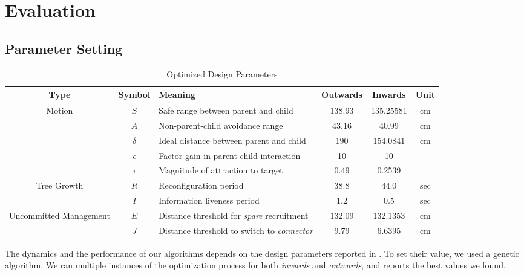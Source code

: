 \section{Evaluation}
\label{sec:evaluation}

\subsection{Parameter Setting}
\label{sec:paramopt}

\begin{table*}[t]
  \centering
  \caption{Optimized Design Parameters}
  \label{tab:paramopt}
  \begin{tabular}{|c|c|l|c|c|c|}
    \hline
    Type & Symbol & Meaning & Outwards & Inwards & Unit\\
    \hline
    \hline
    \multirow{5}{*}{Motion}
    & $S$ & Safe range between parent and child & 138.93 & 135.25581 & cm \\
    \cline{2-6}
    & $A$ & Non-parent-child avoidance range & 43.16 & 40.99 & cm\\
    \cline{2-6}
    & $\delta$ & Ideal distance between parent and child & 190 & 154.0841 & cm\\
    \cline{2-6}
    & $\epsilon$ & Factor gain in parent-child interaction & 10 & 10 & \\
    \cline{2-6}
    & $\tau$ & Magnitude of attraction to target & 0.49 & 0.2539 & \\
    \hline
    \multirow{2}{*}{Tree Growth}
    & $R$ & Reconfiguration period & 38.8 & 44.0 & sec\\
    \cline{2-6}
    & $I$ & Information liveness period & 1.2 & 0.5 & sec\\
    \cline{2-6}
    \hline
    \multirow{2}{*}{Uncommitted Management}
    & $E$ & Distance threshold for \emph{spare} recruitment & 132.09 & 132.1353 & cm\\
    \cline{2-6}
    & $J$ & Distance threshold to switch to \emph{connector} & 9.79 & 6.6395 & cm\\
    \cline{2-6}
    \hline
  \end{tabular}
\end{table*}

The dynamics and the performance of our algorithms depends on the
design parameters reported in . To set their value, we
used a genetic algorithm. We ran multiple instances of the
optimization process for both \emph{inwards} and \emph{outwards}, and
 reports the best values we found.

